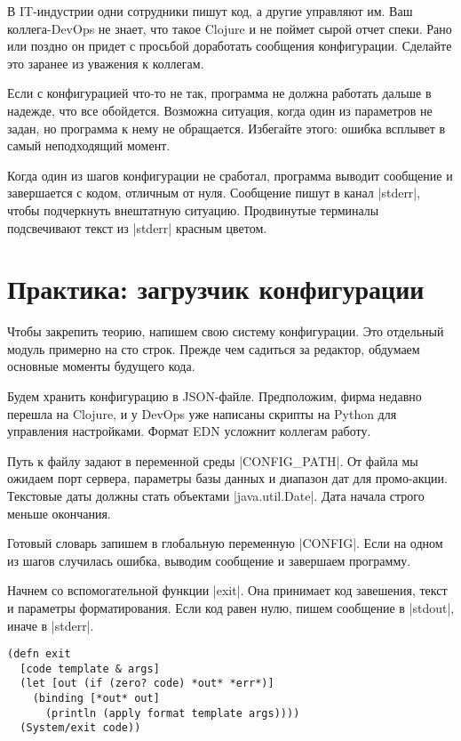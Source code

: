 В IT-индустрии одни сотрудники пишут код, а другие управляют им. Ваш
коллега-DevOps не знает, что такое Clojure и не поймет сырой отчет спеки. Рано
или поздно он придет с просьбой доработать сообщения конфигурации. Сделайте это
заранее из уважения к коллегам.

Если с конфигурацией что-то не так, программа не должна работать дальше в
надежде, что все обойдется. Возможна ситуация, когда один из параметров не
задан, но программа к нему не обращается. Избегайте этого: ошибка всплывет в
самый неподходящий момент.

Когда один из шагов конфигурации не сработал, программа выводит сообщение и
завершается с кодом, отличным от нуля. Сообщение пишут в канал \spverb|stderr|,
чтобы подчеркнуть внештатную ситуацию. Продвинутые терминалы подсвечивают текст
из \spverb|stderr| красным цветом.

\section{Практика: загрузчик конфигурации}

Чтобы закрепить теорию, напишем свою систему конфигурации. Это отдельный модуль
примерно на сто строк. Прежде чем садиться за редактор, обдумаем основные
моменты будущего кода.

Будем хранить конфигурацию в JSON-файле. Предположим, фирма недавно перешла на
Clojure, и у DevOps уже написаны скрипты на Python для управления
настройками. Формат EDN усложнит коллегам работу.

Путь к файлу задают в переменной среды \spverb|CONFIG_PATH|. От файла мы ожидаем
порт сервера, параметры базы данных и диапазон дат для промо-акции. Текстовые
даты должны стать объектами \spverb|java.util.Date|. Дата начала строго меньше
окончания.

Готовый словарь запишем в глобальную переменную \spverb|CONFIG|. Если на одном
из шагов случилась ошибка, выводим сообщение и завершаем программу.

Начнем со вспомогательной функции \spverb|exit|. Она принимает код завешения,
текст и параметры форматирования. Если код равен нулю, пишем сообщение в
\spverb|stdout|, иначе в \spverb|stderr|.

\begin{verbatim}
(defn exit
  [code template & args]
  (let [out (if (zero? code) *out* *err*)]
    (binding [*out* out]
      (println (apply format template args))))
  (System/exit code))
\end{verbatim}

